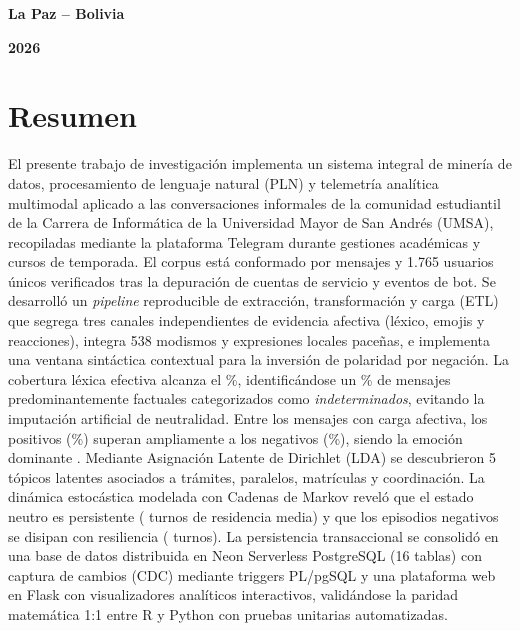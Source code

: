 \documentclass[12pt,letterpaper]{article}
\begin{document}
\begin{titlepage}
  \vfill
  {\fontsize{11}{13}\selectfont \textbf{La Paz -- Bolivia}}\par
  \vspace{0.15cm}
  {\fontsize{11}{13}\selectfont \textbf{2026}}\par
\end{titlepage}

\newpage
\setcounter{page}{2}

\section*{Resumen}

\noindent
El presente trabajo de investigación implementa un sistema integral de minería de datos, procesamiento de lenguaje natural (PLN) y telemetría analítica multimodal aplicado a las conversaciones informales de la comunidad estudiantil de la Carrera de Informática de la Universidad Mayor de San Andrés (UMSA), recopiladas mediante la plataforma Telegram durante gestiones académicas y cursos de temporada. El corpus está conformado por \nMensajes{} mensajes y 1.765 usuarios únicos verificados tras la depuración de cuentas de servicio y eventos de bot. Se desarrolló un \emph{pipeline} reproducible de extracción, transformación y carga (ETL) que segrega tres canales independientes de evidencia afectiva (léxico, emojis y reacciones), integra 538 modismos y expresiones locales paceñas, e implementa una ventana sintáctica contextual para la inversión de polaridad por negación. La cobertura léxica efectiva alcanza el \pctCobertura{}\%, identificándose un \pctIndeterminado{}\% de mensajes predominantemente factuales categorizados como \emph{indeterminados}, evitando la imputación artificial de neutralidad. Entre los mensajes con carga afectiva, los positivos (\pctPositivos{}\%) superan ampliamente a los negativos (\pctNegativos{}\%), siendo la emoción dominante \emph{\emocionTop{}}. Mediante Asignación Latente de Dirichlet (LDA) se descubrieron 5 tópicos latentes asociados a trámites, paralelos, matrículas y coordinación. La dinámica estocástica modelada con Cadenas de Markov reveló que el estado neutro es persistente (\permanenciaNeutro{} turnos de residencia media) y que los episodios negativos se disipan con resiliencia (\recuperacionNegativa{} turnos). La persistencia transaccional se consolidó en una base de datos distribuida en Neon Serverless PostgreSQL (16 tablas) con captura de cambios (CDC) mediante triggers PL/pgSQL y una plataforma web en Flask con visualizadores analíticos interactivos, validándose la paridad matemática 1:1 entre R y Python con pruebas unitarias automatizadas.
\end{document}
